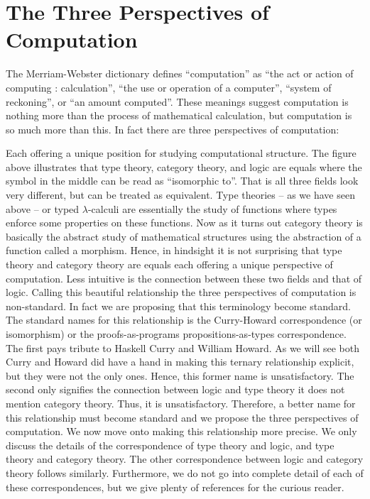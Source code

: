 \documentclass{article}
\begin{document}
\section{The Three Perspectives of Computation}
\label{sec:the_three_perspectives}
The Merriam-Webster dictionary defines ``computation'' as ``the act or
action of computing : calculation'', ``the use or operation of a
computer'', ``system of reckoning'', or ``an amount computed''.  These
meanings suggest computation is nothing more than the process of
mathematical calculation, but computation is so much more than this.
In fact there are three perspectives of computation:
    \begin{center}
    \end{center}
Each offering a unique position for studying computational structure.
The figure above illustrates that type theory, category theory, and
logic are equals where the symbol in the middle can be read as
``isomorphic to''.  That is all three fields look very different, but
can be treated as equivalent.  Type theories -- as we have seen above
-- or typed $\lambda$-calculi are essentially the study of functions
where types enforce some properties on these functions.  Now as it
turns out category theory is basically the abstract study of
mathematical structures using the abstraction of a function called a
morphism.  Hence, in hindsight it is not surprising that type theory
and category theory are equals each offering a unique perspective of
computation.  Less intuitive is the connection between these two
fields and that of logic.  Calling this beautiful relationship the
three perspectives of computation is non-standard.  In fact we are
proposing that this terminology become standard.  The standard names
for this relationship is the Curry-Howard correspondence (or
isomorphism) or the proofs-as-programs propositions-as-types
correspondence.  The first pays tribute to Haskell Curry and William
Howard. As we will see both Curry and Howard did have a hand in making
this ternary relationship explicit, but they were not the only ones.
Hence, this former name is unsatisfactory. The second only signifies
the connection between logic and type theory it does not mention
category theory.  Thus, it is unsatisfactory.  Therefore, a better
name for this relationship must become standard and we propose the
three perspectives of computation.  We now move onto making this
relationship more precise.  We only discuss the details of the
correspondence of type theory and logic, and type theory and category
theory.  The other correspondence between logic and category theory
follows similarly. Furthermore, we do not go into complete detail of
each of these correspondences, but we give plenty of references for
the curious reader.
\end{document}
